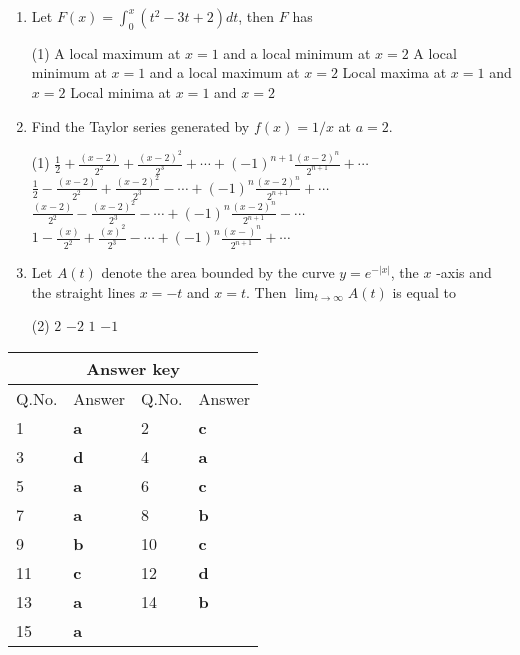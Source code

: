 \begin{enumerate}
\item  Let $F(x)=\int_{0}^{x}\left(t^{2}-3 t+2\right) d t$, then $F$ has
\begin{tasks}(1)
	\task[\textbf{a.}] A local maximum at $x=1$ and a local minimum at $x=2$ 
	\task[\textbf{b.}]A local minimum at $x=1$ and a local maximum at $x=2$
	\task[\textbf{c.}] Local maxima at $x=1$ and $x=2$
	\task[\textbf{d.}] Local minima at $x=1$ and $x=2$
\end{tasks}
\item Find the Taylor series generated by $f(x)=1 / x$ at $a=2$.
\begin{tasks}(1)
	\task[\textbf{a.}]$\frac{1}{2}+\frac{(x-2)}{2^{2}}+\frac{(x-2)^{2}}{2^{3}}+\cdots+(-1)^{n+1} \frac{(x-2)^{n}}{2^{n+1}}+\cdots$  
	\task[\textbf{b.}]$\frac{1}{2}-\frac{(x-2)}{2^{2}}+\frac{(x-2)^{2}}{2^{3}}-\cdots+(-1)^{n} \frac{(x-2)^{n}}{2^{n+1}}+\cdots$
	\task[\textbf{c.}] $\frac{(x-2)}{2^{2}}-\frac{(x-2)^{2}}{2^{3}}-\cdots+(-1)^{n} \frac{(x-2)^{n}}{2^{n+1}}-\cdots$
	\task[\textbf{d.}] $1-\frac{(x)}{2^{2}}+\frac{(x)^{2}}{2^{3}}-\cdots+(-1)^{n} \frac{(x-)^{n}}{2^{n+1}}+\cdots$
\end{tasks}
\item Let $A(t)$ denote the area bounded by the curve $y=e^{-|x|}$, the $x$ -axis and the straight lines $x=-t$
and $x=t$. Then $\lim _{t \rightarrow \infty} A(t)$ is equal to
\begin{tasks}(2)
	\task[\textbf{a.}]$2$  
	\task[\textbf{b.}]$-2$
	\task[\textbf{c.}]$1$ 
	\task[\textbf{d.}]$-1$ 
\end{tasks}
\end{enumerate}
\setlength\arrayrulewidth{1pt}
\begin{table}[H]
	\centering
	
	\begin{tabular}{|p{1.5cm}|p{1.5cm}||p{1.5cm}|p{1.5cm}|}
		\hline
		\multicolumn{4}{|c|}{\textbf{Answer key}}\\\hline\hline
		\rowcolor{ocrel}Q.No.&Answer&Q.No.&Answer\\\hline
		1&\textbf{a}&2&\textbf{c}\\\hline 
		3&\textbf{d}&4&\textbf{a}\\\hline
		5&\textbf{a}&6&\textbf{c}\\\hline
		7&\textbf{a}&8&\textbf{b}\\\hline
		9&\textbf{b}&10&\textbf{c}\\\hline
		11&\textbf{c}&12&\textbf{d}\\\hline
		13&\textbf{a}&14&\textbf{b}\\\hline
		15&\textbf{a}&&\\\hline
	\end{tabular}
\end{table}
